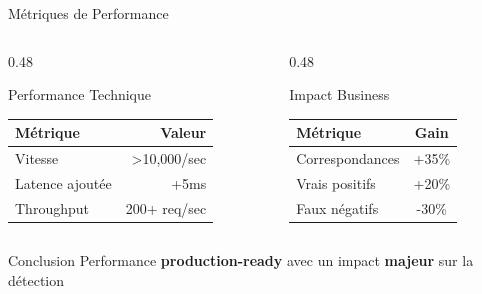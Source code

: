 \documentclass[aspectratio=169]{beamer}
\begin{document}
\begin{frame}{Métriques de Performance}
    \begin{columns}[T]
        \begin{column}{0.48\textwidth}
            \begin{block}{Performance Technique}
                \begin{table}
                    \small
                    \begin{tabular}{lr}
                        \toprule
                        \textbf{Métrique} & \textbf{Valeur} \\
                        \midrule
                        Vitesse & >10,000/sec \\
                        Latence ajoutée & +5ms \\
                        Throughput & 200+ req/sec \\
                        \bottomrule
                    \end{tabular}
                \end{table}
            \end{block}
        \end{column}
        \begin{column}{0.48\textwidth}
            \begin{block}{Impact Business}
                \begin{table}
                    \small
                    \begin{tabular}{lc}
                        \toprule
                        \textbf{Métrique} & \textbf{Gain} \\
                        \midrule
                        Correspondances & \textcolor{vertSucces}{+35\%} \\
                        Vrais positifs & \textcolor{vertSucces}{+20\%} \\
                        Faux négatifs & \textcolor{vertSucces}{-30\%} \\
                        \bottomrule
                    \end{tabular}
                \end{table}
            \end{block}
        \end{column}
    \end{columns}

    \vspace{0.5cm}

    \begin{exampleblock}{Conclusion}
        \centering
        \Large Performance \textbf{production-ready} avec un impact \textbf{majeur} sur la détection
    \end{exampleblock}
\end{frame}
\end{document}
